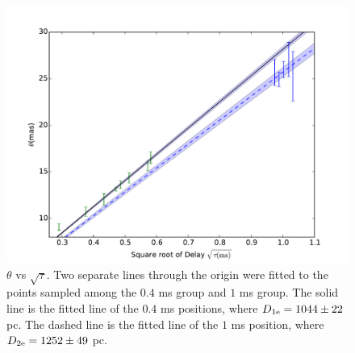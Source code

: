\documentclass[useAMS,usenatbib]{mn2e}
\begin{document}
\begin{figure}
\centering
\includegraphics[width=1.0\linewidth, angle=0]{Theta_tau.pdf}
\caption{${\theta}$ vs ${\sqrt{\tau}}$.  Two separate lines through the
  origin were fitted to the points sampled among the $0.4$ ms group
  and $1$ ms group.  The solid line is the fitted line of the $0.4$ ms
  positions, where $D_{1\rm e}=1044\pm 22$ pc. The dashed line is
  the fitted line of the $1$ ms 
  position, where $D_{2\rm e}=1252\pm 49$ pc.
}
\label{thetatau}
\end{figure}
\end{document}
